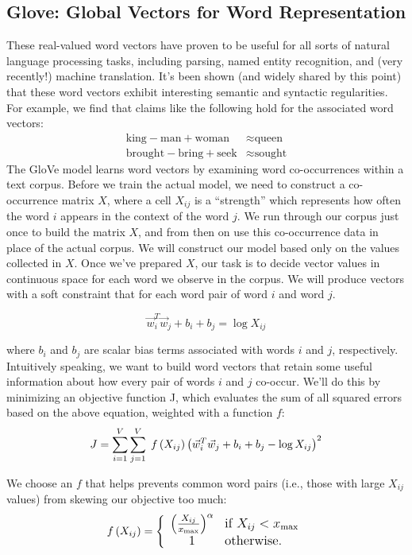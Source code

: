 \subsection{Glove: Global Vectors for Word Representation}
These real-valued word vectors have proven to be useful for all sorts of natural language processing tasks, including parsing, named entity recognition, and (very recently!) machine translation\cite{pennington2014glove}.
It’s been shown (and widely shared by this point) that these word vectors exhibit interesting semantic and syntactic regularities. For example, we find that claims like the following hold for the associated word vectors:
 \begin{align*}\text{king} - \text{man} + \text{woman} &\approx \text{queen} \\ \text{brought} - \text{bring} + \text{seek} &\approx \text{sought}\end{align*}
 The GloVe model learns word vectors by examining word co-occurrences within a text corpus. Before we train the actual model, we need to construct a co-occurrence matrix $X$, where a cell $X_{ij}$ is a “strength” which represents how often the word $i$ appears in the context of the word $j$. We run through our corpus just once to build the matrix $X$, and from then on use this co-occurrence data in place of the actual corpus. We will construct our model based only on the values collected in $X$.
Once we’ve prepared $X$, our task is to decide vector values in continuous space for each word we observe in the corpus. We will produce vectors with a soft constraint that for each word pair of word $i$ and word $j$.

 \begin{equation}
     \vec{w}_i^T \vec{w}_j + b_i + b_j = \log X_{ij}
 \end{equation}
 
where $b_i$ and $b_j$ are scalar bias terms associated with words $i$ and $j$, respectively. Intuitively speaking, we want to build word vectors that retain some useful information about how every pair of words $i$ and $j$ co-occur.
We’ll do this by minimizing an objective function J, which evaluates the sum of all squared errors based on the above equation, weighted with a function $f$:
\begin{equation}
\large
J = \sum_{i=1}^V \sum_{j=1}^V \; f\left(X_{ij}\right) \left( \vec{w}_i^T \vec{w}_j + b_i + b_j - \log X_{ij} \right)^2 
\end{equation}

We choose an $f$ that helps prevents common word pairs (i.e., those with large $X_{ij}$ values) from skewing our objective too much:
 \begin{equation}
     \large
      f\left(X_{ij}\right) = \left\{ \begin{array}{cl}\left(\frac{X_{ij}}{x_{\text{max}}}\right)^\alpha 
      & \text{if } X_{ij} < x_{\text{max}} \\ 1 & \text{otherwise.} \end{array}\right. \end{equation}
      
